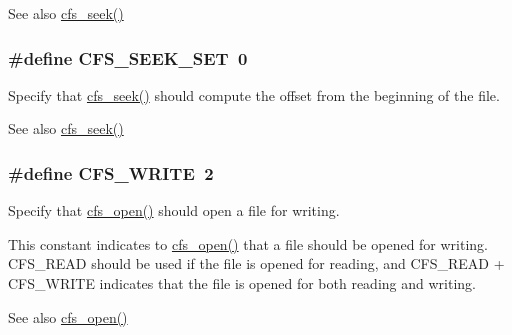 \begin{DoxySeeAlso}{See also}
\hyperlink{group__cfs_ga116cdc7036a99707477b50bd496fa1c1}{cfs\+\_\+seek()} 
\end{DoxySeeAlso}
\hypertarget{group__cfs_ga72cd7360175436b7ed26606708314dc0}{}
\subsubsection[{C\+F\+S\+\_\+\+S\+E\+E\+K\+\_\+\+S\+E\+T}]{\setlength{\rightskip}{0pt plus 5cm}\#define C\+F\+S\+\_\+\+S\+E\+E\+K\+\_\+\+S\+E\+T~0}\label{group__cfs_ga72cd7360175436b7ed26606708314dc0}
Specify that \hyperlink{group__cfs_ga116cdc7036a99707477b50bd496fa1c1}{cfs\+\_\+seek()} should compute the offset from the beginning of the file.

\begin{DoxySeeAlso}{See also}
\hyperlink{group__cfs_ga116cdc7036a99707477b50bd496fa1c1}{cfs\+\_\+seek()} 
\end{DoxySeeAlso}
\hypertarget{group__cfs_ga798793edf50f38e3e41364f0f6f71201}{}
\subsubsection[{C\+F\+S\+\_\+\+W\+R\+I\+T\+E}]{\setlength{\rightskip}{0pt plus 5cm}\#define C\+F\+S\+\_\+\+W\+R\+I\+T\+E~2}\label{group__cfs_ga798793edf50f38e3e41364f0f6f71201}
Specify that \hyperlink{group__cfs_gadc1727a1a27a40a8483135425a42c5de}{cfs\+\_\+open()} should open a file for writing.

This constant indicates to \hyperlink{group__cfs_gadc1727a1a27a40a8483135425a42c5de}{cfs\+\_\+open()} that a file should be opened for writing. C\+F\+S\+\_\+\+R\+E\+A\+D should be used if the file is opened for reading, and C\+F\+S\+\_\+\+R\+E\+A\+D + C\+F\+S\+\_\+\+W\+R\+I\+T\+E indicates that the file is opened for both reading and writing.

\begin{DoxySeeAlso}{See also}
\hyperlink{group__cfs_gadc1727a1a27a40a8483135425a42c5de}{cfs\+\_\+open()} 
\end{DoxySeeAlso}


